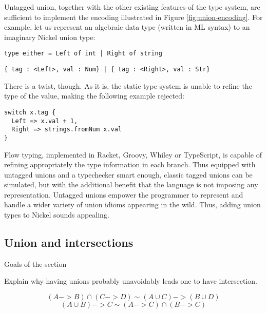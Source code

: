 \documentclass{article}
\begin{document}
Untagged union, together with the other existing features of the type system,
are sufficient to implement the encoding illustrated in Figure
\ref{fig:union-encoding}. For example, let us represent an algebraic data type
(written in ML syntax) to an imaginary Nickel union type:

\begin{lstlisting}
type either = Left of int | Right of string
\end{lstlisting}

\begin{lstlisting}
{ tag : <Left>, val : Num} | { tag : <Right>, val : Str}
\end{lstlisting}

There is a twist, though. As it is, the static type system is unable to refine
the type of the value, making the following example rejected:

\begin{lstlisting}
switch x.tag {
  Left => x.val + 1,
  Right => strings.fromNum x.val
}
\end{lstlisting}

Flow typing, implemented in Racket\cite{FlowTypingRacket1, FlowTypingRacket2},
Groovy\cite{FlowTypingGroovy}, Whiley\cite{FlowTypingWhiley} or
TypeScript\cite{FlowTypingTypeScript}, is capable of refining appropriately the
type information in each branch. Thus equipped with untagged unions and a
typechecker smart enough, classic tagged unions can be simulated, but with the
additional benefit that the language is not imposing any representation.
Untagged unions empower the programmer to represent and handle a wider variety
of union idioms appearing in the wild.  Thus, adding union types to Nickel
sounds appealing.

\subsection{Union and intersections}
\color{red}Goals of the section

Explain why having unions probably unavoidably leads one to have intersection.\vspace{0.5cm}\color{black}

$$(A -> B) \cap (C -> D) \sim (A \cup C) -> (B \cup D)$$
$$(A \cup B) -> C \sim (A -> C) \cap (B -> C)$$


\printbibliography
\end{document}
